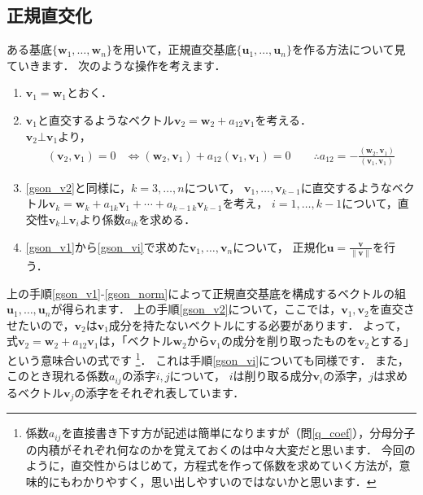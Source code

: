 \documentclass[dvipdfmx]{jsarticle}
\theoremstyle{definition}
\begin{document}
\subsection{正規直交化}  \label{subsec_gson}
ある基底$\{ \bm{w}_1, \ldots, \bm{w}_n \}$を用いて，正規直交基底$\{ \bm{u}_1, \ldots, \bm{u}_n \}$を作る方法について見ていきます．
次のような操作を考えます．
%
\begin{enumerate}
    \item $\bm{v}_1 = \bm{w}_1$とおく．
        \label{gson_v1}
    \item $\bm{v}_1$と直交するようなベクトル$\bm{v}_2 = \bm{w}_2 + a_{12} \bm{v}_1$を考える． \\
        $\bm{v}_2 \bot \bm{v}_1$より，
        \begin{align}
            (\bm{v}_2, \bm{v}_1) = 0
            &\iff (\bm{w}_2, \bm{v}_1) + a_{12} (\bm{v}_1, \bm{v}_1) = 0
            \qquad \therefore a_{12} = -\frac{(\bm{w}_2, \bm{v}_1)}{(\bm{v}_1, \bm{v}_1)}
        \end{align}
        \label{gson_v2}
    \item \ref{gson_v2}と同様に，$k=3, \ldots, n$について，
        $\bm{v}_1, \ldots, \bm{v}_{k-1}$に直交するようなベクトル$\bm{v}_k = \bm{w}_k + a_{1k} \bm{v}_1 + \cdots + a_{k-1\,k} \bm{v}_{k-1}$を考え，
        $i = 1, \ldots, k-1$について，直交性$\bm{v}_k \bot \bm{v}_i$より係数$a_{ik}$を求める．
        \label{gson_vi}
    \item \ref{gson_v1}から\ref{gson_vi}で求めた$\bm{v}_1, \ldots, \bm{v}_n$について，
        正規化$\displaystyle \bm{u} = \frac{\bm{v}}{\|\bm{v}\|}$を行う．
        \label{gson_norm}
\end{enumerate}
%
上の手順\ref{gson_v1}-\ref{gson_norm}によって正規直交基底を構成するベクトルの組$\bm{u}_1, \ldots, \bm{u}_n$が得られます．
上の手順\ref{gson_v2}について，ここでは，$\bm{v}_1, \bm{v}_2$を直交させたいので，$\bm{v}_2$は$\bm{v}_1$成分を持たないベクトルにする必要があります．
よって，式$\bm{v}_2 = \bm{w}_2 + a_{12}\bm{v}_1$は，「ベクトル$\bm{w}_2$から$\bm{v}_1$の成分を削り取ったものを$\bm{v}_2$とする」という意味合いの式です
\footnote{
    係数$a_{ij}$を直接書き下す方が記述は簡単になりますが（問\ref{q_coef}），分母分子の内積がそれぞれ何なのかを覚えておくのは中々大変だと思います．
    今回のように，直交性からはじめて，方程式を作って係数を求めていく方法が，意味的にもわかりやすく，思い出しやすいのではないかと思います．
}．
これは手順\ref{gson_vi}についても同様です．
また，このとき現れる係数$a_{ij}$の添字$i, j$について，
$i$は削り取る成分$\bm{v}_i$の添字，$j$は求めるベクトル$\bm{v}_j$の添字をそれぞれ表しています．
\end{document}
